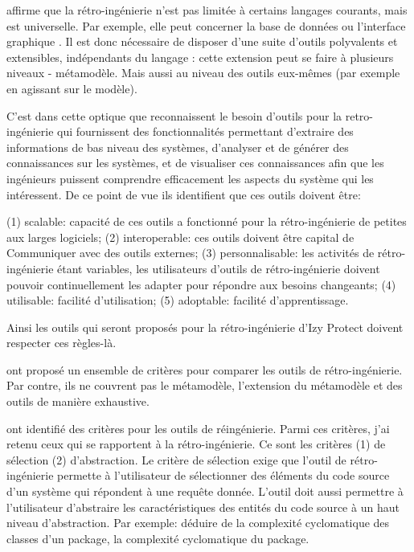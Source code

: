 \documentclass[a4paper]{article}
\begin{document}
\citet{Brun14c} affirme que la rétro-ingénierie n'est pas limitée à certains langages courants, mais est universelle. 
Par exemple, elle peut concerner la base de données \cite{Delp20a} ou l'interface graphique \cite{Verh19a}.
Il est donc nécessaire de disposer d'une suite d'outils polyvalents et extensibles, indépendants du langage : cette extension peut se faire à plusieurs niveaux - métamodèle.
Mais aussi au niveau des outils eux-mêmes (par exemple en agissant sur le modèle).

C'est dans cette optique que \citet{Kien10a} reconnaissent  le besoin d'outils pour la retro-ingénierie qui fournissent des fonctionnalités permettant d'extraire des informations de bas niveau des systèmes, d'analyser et de générer des connaissances sur les systèmes, et de visualiser ces connaissances afin que les ingénieurs puissent comprendre efficacement les aspects du système qui les intéressent.
De ce point de vue ils identifient que ces outils doivent être:

  (1) scalable: capacité de ces outils a fonctionné pour la rétro-ingénierie de petites aux larges logiciels;
  (2) interoperable: ces outils doivent être capital de Communiquer avec des outils externes;
 (3) personnalisable: les activités de rétro-ingénierie étant variables, les utilisateurs d'outils de rétro-ingénierie doivent pouvoir continuellement
 les  adapter pour répondre aux besoins changeants;
 (4) utilisable: facilité d'utilisation;
(5) adoptable: facilité d'apprentissage.

Ainsi les outils qui seront proposés pour la rétro-ingénierie d'Izy Protect doivent respecter ces règles-là.

\citet{Bell98a} ont proposé un ensemble de critères pour comparer les outils de rétro-ingénierie.
Par contre, ils ne couvrent pas le métamodèle, l'extension du métamodèle et des outils de manière exhaustive.

\citet{Govi18a} ont identifié des critères pour les outils de réingénierie. 
Parmi ces critères, j'ai retenu ceux qui se rapportent à la rétro-ingénierie.
Ce sont les critères (1) de sélection (2) d'abstraction.  
Le critère de sélection exige que l'outil de rétro-ingénierie permette à l'utilisateur de sélectionner des éléments  du code source d'un système 
qui répondent à une requête donnée.
L'outil doit aussi permettre à l'utilisateur d'abstraire les caractéristiques des entités du code source à un haut niveau d'abstraction. 
Par exemple: déduire de la complexité cyclomatique des classes d'un package, la complexité cyclomatique du package.
\end{document}
